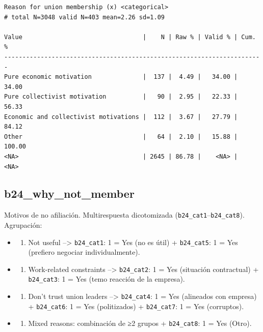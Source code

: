 \documentclass[
  letterpaper,
  DIV=11,
  numbers=noendperiod]{scrreprt}
\providecommand{\tightlist}{%
  \setlength{\itemsep}{0pt}\setlength{\parskip}{0pt}}
\begin{document}
\begin{verbatim}
Reason for union membership (x) <categorical> 
# total N=3048 valid N=403 mean=2.26 sd=1.09

Value                                 |    N | Raw % | Valid % | Cum. %
-----------------------------------------------------------------------
Pure economic motivation              |  137 |  4.49 |   34.00 |  34.00
Pure collectivist motivation          |   90 |  2.95 |   22.33 |  56.33
Economic and collectivist motivations |  112 |  3.67 |   27.79 |  84.12
Other                                 |   64 |  2.10 |   15.88 | 100.00
<NA>                                  | 2645 | 86.78 |    <NA> |   <NA>
\end{verbatim}

\subsection{b24\_why\_not\_member}\label{b24_why_not_member}

Motivos de no afiliación. Multirespuesta dicotomizada
(\texttt{b24\_cat1}--\texttt{b24\_cat8}). Agrupación:

\begin{itemize}
\tightlist
\item
  \begin{enumerate}
  \def\labelenumi{\arabic{enumi}.}
  \tightlist
  \item
    Not useful --\textgreater{} \texttt{b24\_cat1}: 1 = Yes (no es útil)
    + \texttt{b24\_cat5}: 1 = Yes (prefiero negociar individualmente).
  \end{enumerate}
\item
  \begin{enumerate}
  \def\labelenumi{\arabic{enumi}.}
  \setcounter{enumi}{1}
  \tightlist
  \item
    Work-related constraints --\textgreater{} \texttt{b24\_cat2}: 1 =
    Yes (situación contractual) + \texttt{b24\_cat3}: 1 = Yes (temo
    reacción de la empresa).
  \end{enumerate}
\item
  \begin{enumerate}
  \def\labelenumi{\arabic{enumi}.}
  \setcounter{enumi}{2}
  \tightlist
  \item
    Don't trust union leaders --\textgreater{} \texttt{b24\_cat4}: 1 =
    Yes (alineados con empresa) + \texttt{b24\_cat6}: 1 = Yes
    (politizados) + \texttt{b24\_cat7}: 1 = Yes (corruptos).
  \end{enumerate}
\item
  \begin{enumerate}
  \def\labelenumi{\arabic{enumi}.}
  \setcounter{enumi}{3}
  \tightlist
  \item
    Mixed reasons: combinación de ≥2 grupos + \texttt{b24\_cat8}: 1 =
    Yes (Otro).
  \end{enumerate}
\end{itemize}
\end{document}
